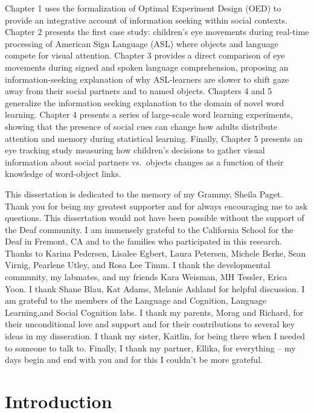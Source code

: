 \documentclass[oneside]{report}
\begin{document}
Chapter 1 uses the formalization of Optimal Experiment Design (OED) to
provide an integrative account of information seeking within social
contexts. Chapter 2 presents the first case study: children's eye
movements during real-time processing of American Sign Language (ASL)
where objects and language compete for visual attention. Chapter 3
provides a direct comparison of eye movements during signed and spoken
language comprehension, proposing an information-seeking explanation of
why ASL-learners are slower to shift gaze away from their social
partners and to named objects. Chapters 4 and 5 generalize the
information seeking explanation to the domain of novel word learning.
Chapter 4 presents a series of large-scale word learning experiments,
showing that the presence of social cues can change how adults
distribute attention and memory during statistical learning. Finally,
Chapter 5 presents an eye tracking study measuring how children's
decisions to gather visual information about social partners vs.~objects
changes as a function of their knowledge of word-object links.

This dissertation is dedicated to the memory of my Grammy, Sheila Paget.
Thank you for being my greatest supporter and for always encouraging me
to ask questions.
This dissertation would not have been possible without the support of
the Deaf community. I am immensely grateful to the California School for
the Deaf in Fremont, CA and to the families who participated in this
research. Thanks to Karina Pedersen, Lisalee Egbert, Laura Petersen,
Michele Berke, Sean Virnig, Pearlene Utley, and Rosa Lee Timm. I thank
the developmental community, my labmates, and my friends Kara Weisman,
MH Tessler, Erica Yoon. I thank Shane Blau, Kat Adams, Melanie Ashland
for helpful discussion. I am grateful to the members of the Language and
Cognition, Language Learning,and Social Cognition labs. I thank my
parents, Morag and Richard, for their unconditional love and support and
for their contributions to several key ideas in my disseration. I thank
my sister, Kaitlin, for being there when I needed to someone to talk to.
Finally, I thank my partner, Ellika, for everything -- my days begin and
end with you and for this I couldn't be more grateful.

\afterpreface


\hypertarget{intro}{%
\chapter*{Introduction}\label{intro}}
\end{document}
